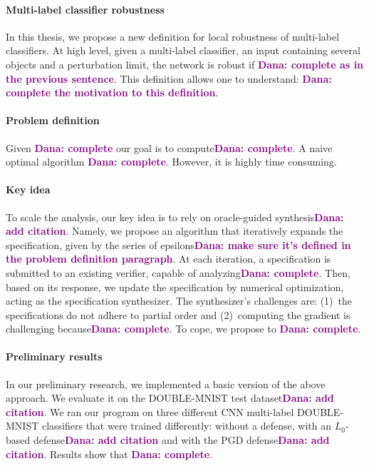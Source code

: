\documentclass[11pt]{article}
\newcommand{\Dana}[1]{\textcolor{purple}{\bf Dana: #1}}
\begin{document}
\paragraph{Multi-label classifier robustness}
In this thesis, we propose a new definition for local robustness of multi-label classifiers. At high level, given a multi-label classifier, an input containing several objects and a perturbation limit, the network is robust if \Dana{complete as in the previous sentence}. This definition allows one to understand: \Dana{complete the motivation to this definition}.

\paragraph{Problem definition} Given \Dana{complete} our goal is to compute\Dana{complete}. A naive optimal algorithm \Dana{complete}. However, it is highly time consuming. 

\paragraph{Key idea} To scale the analysis, our key idea is to rely on oracle-guided synthesis\Dana{add citation}. Namely, we propose an algorithm that iteratively expands the specification, given by the series of epsilons\Dana{make sure it's defined in the problem definition paragraph}. At each iteration, a specification is submitted to an existing verifier, capable of analyzing\Dana{complete}. Then, based on its response, we update the specification by numerical optimization, acting as the specification synthesizer. 
The synthesizer's challenges are: (1)~the specifications do not adhere to partial order and (2)~computing the gradient is challenging because\Dana{complete}. To cope, we propose to \Dana{complete}.

 \paragraph{Preliminary results} 
In our preliminary research, we implemented a basic version of the above approach. We evaluate it on the DOUBLE-MNIST test dataset\Dana{add citation}.
We ran our program on three different CNN multi-label DOUBLE-MNIST classifiers that were trained differently: without a defense, with an $L_0$-based defense\Dana{add citation} and with the PGD defense\Dana{add citation}.
Results show that \Dana{complete}.
\end{document}
